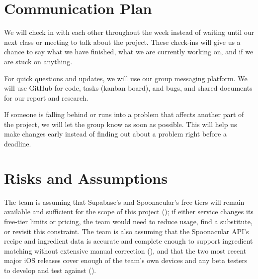 \section{Communication Plan}
We will check in with each other throughout the week instead of waiting until our next class or meeting to talk about the project. These check-ins will give us a chance to say what we have finished, what we are currently working on, and if we are stuck on anything.

For quick questions and updates, we will use our group messaging platform. We will use GitHub for code, tasks (kanban board), and bugs, and shared documents for our report and research.

If someone is falling behind or runs into a problem that affects another part of the project, we will let the group know as soon as possible. This will help us make changes early instead of finding out about a problem right before a deadline.

\section{Risks and Assumptions}
The team is assuming that Supabase's and Spoonacular's free tiers will remain available and sufficient for the scope of this project (); if either service changes its free-tier limits or pricing, the team would need to reduce usage, find a substitute, or revisit this constraint. The team is also assuming that the Spoonacular API's recipe and ingredient data is accurate and complete enough to support ingredient matching without extensive manual correction (), and that the two most recent major iOS releases cover enough of the team's own devices and any beta testers to develop and test against ().


